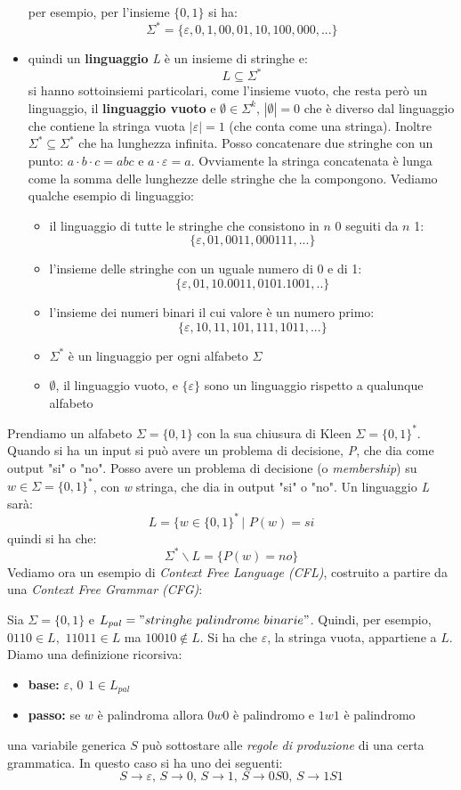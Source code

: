 \documentclass[a4paper,12pt, oneside]{book}
\begin{document}
\begin{itemize}
per esempio, per l'insieme $\{0,1\}$ si ha:
$$\Sigma^*=\{\varepsilon,0,1,00,01,10,100,000,...\}$$
\item quindi un \textbf{linguaggio} \textit{L} è un insieme di stringhe e:
$$L\subseteq \Sigma^*$$ 
si hanno sottoinsiemi particolari, come l'insieme vuoto, che resta però un linguaggio, il \textbf{linguaggio vuoto} e $\emptyset\in\Sigma^k,\,|\emptyset|=0$ che è diverso dal linguaggio che contiene la stringa vuota $|\varepsilon|=1$ (che conta come una stringa). Inoltre $\Sigma^*\subseteq \Sigma^*$ che ha lunghezza infinita. Posso concatenare due stringhe con un punto: $a\cdot b\cdot c=abc$ e $a\cdot \varepsilon=a$. Ovviamente la stringa concatenata è lunga come la somma delle lunghezze delle stringhe che la compongono. Vediamo qualche esempio di linguaggio:
\begin{itemize}
\item il linguaggio di tutte le stringhe che consistono in $n$ 0 seguiti da $n$ 1:
$$\{\varepsilon,01,0011,000111,...\}$$
\item l'insieme delle stringhe con un uguale numero di 0 e di 1:
$$\{\varepsilon,01,10.0011,0101.1001,..\}$$
\item l'insieme dei numeri binari il cui valore è un numero primo:
$$\{\varepsilon,10 , 11, 101, 111,1011,...\}$$
\item $\Sigma^*$ è un linguaggio per ogni alfabeto $\Sigma$
\item $\emptyset$, il linguaggio vuoto, e $\{\varepsilon\}$ sono un linguaggio rispetto a qualunque alfabeto
\end{itemize}
\end{itemize}
Prendiamo un alfabeto $\Sigma=\{0, 1\}$ con la sua chiusura di Kleen $\Sigma=\{0, 1\}^*$. Quando si ha un input si può avere un problema di decisione, \textit{P}, che dia come output "si" o "no". Posso avere un problema di decisione (o \textit{membership}) su $w\in\Sigma=\{0, 1\}^*$, con \textit{w} stringa, che dia in output "si" o "no". Un linguaggio \textit{L} sarà:
$$L=\{w\in\{0, 1\}^*\,|\,\, P(w)=si$$
quindi si ha che:
$$\Sigma^*\backslash L=\{P(w)=no\}$$
Vediamo ora un esempio di \textit{Context Free Language (CFL)}, costruito a partire da una \textit{Context Free Grammar (CFG)}:
\begin{esempio}
Sia $\Sigma=\{0, 1\}$ e $L_{pal}="stringhe\,\, palindrome\,\, binarie"$.
Quindi, per esempio, $0110\in L,\,\, 11011\in L$ ma $10010\not\in L$. Si ha che $\varepsilon$, la stringa vuota, appartiene a $L$. Diamo una definizione ricorsiva:
\begin{itemize}
\item \textbf{base:} $\varepsilon,\, 0\,\ 1\in L_{pal}$
\item \textbf{passo:} se $w$ è palindroma allora $0w0$ è palindromo e $1w1$ è palindromo
\end{itemize}
una variabile generica $S$ può sottostare alle \textit{regole di produzione} di una certa grammatica. In questo caso si ha uno dei seguenti:
$$S\to\varepsilon,\, S\to 0,\, S\to 1,\, S\to 0S0,\, S\to 1S1$$
\end{esempio}
\end{document}
